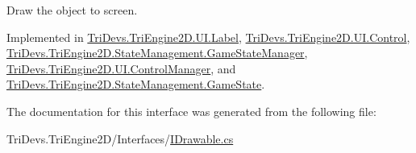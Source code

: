 Draw the object to screen. 



Implemented in \hyperlink{class_tri_devs_1_1_tri_engine2_d_1_1_u_i_1_1_label_aaa532c9037ca1b51bab8f7eb2673438d}{Tri\-Devs.\-Tri\-Engine2\-D.\-U\-I.\-Label}, \hyperlink{class_tri_devs_1_1_tri_engine2_d_1_1_u_i_1_1_control_a9b3ac8028bcf4b7e4d128e2be6f30fed}{Tri\-Devs.\-Tri\-Engine2\-D.\-U\-I.\-Control}, \hyperlink{class_tri_devs_1_1_tri_engine2_d_1_1_state_management_1_1_game_state_manager_a2d30555c64bf3337e1b6a328abde489e}{Tri\-Devs.\-Tri\-Engine2\-D.\-State\-Management.\-Game\-State\-Manager}, \hyperlink{class_tri_devs_1_1_tri_engine2_d_1_1_u_i_1_1_control_manager_a983b69c93c3d66ef1d7f324d3ea80ace}{Tri\-Devs.\-Tri\-Engine2\-D.\-U\-I.\-Control\-Manager}, and \hyperlink{class_tri_devs_1_1_tri_engine2_d_1_1_state_management_1_1_game_state_a53a4361f96b0a795f4bb20a5ae5cf954}{Tri\-Devs.\-Tri\-Engine2\-D.\-State\-Management.\-Game\-State}.



The documentation for this interface was generated from the following file\-:\begin{DoxyCompactItemize}
\item 
Tri\-Devs.\-Tri\-Engine2\-D/\-Interfaces/\hyperlink{_i_drawable_8cs}{I\-Drawable.\-cs}\end{DoxyCompactItemize}
